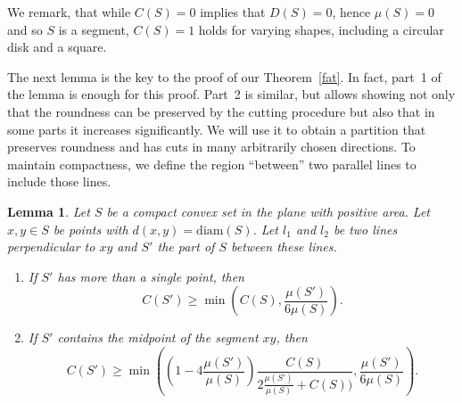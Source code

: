 \documentclass[12pt]{article}
\theoremstyle{plain}
\newtheorem{lemma}[theorem]{Lemma}
\theoremstyle{definition}
\theoremstyle{remark}
\def\diam{\mathrm{diam}}
\begin{document}
We remark, that while $C(S)=0$ implies that $D(S)=0$, hence $\mu(S)=0$ and so $S$ is a segment, $C(S)=1$ holds for varying shapes, including a circular disk and a square.

The next lemma is the key to the proof of our Theorem~\ref{fat}. In fact, part~1 of the lemma is enough for this proof. Part~2 is similar, but allows showing not only that the roundness can be preserved by the cutting procedure but also that in some parts it increases significantly. We will use it to obtain a partition that preserves roundness and has cuts in many arbitrarily chosen directions. To maintain compactness, we define the region ``between'' two parallel lines to include those lines.

\begin{lemma}\label{sections}
Let $S$ be a compact convex set in the plane with positive area. Let $x,y\in S$ be points with $d(x,y)=\diam(S)$. Let $l_1$ and $l_2$ be two lines perpendicular to $xy$ and $S'$ the part of $S$ between these lines. 
\begin{enumerate}
\item If $S'$ has more than a single point, then
$$C(S')\ge\min\left(C(S),\frac{\mu(S')}{6\mu(S)}\right).$$
\item If $S'$ contains the midpoint of the segment $xy$, then
$$C(S')\ge\min\left(\left(1-4\frac{\mu(S')}{\mu(S)}\right)\frac{C(S)}{2\frac{\mu(S')}{\mu(S)}+C(S))},\frac{\mu(S')}{6\mu(S)}\right).$$
\end{enumerate}
\end{lemma}
\end{document}
